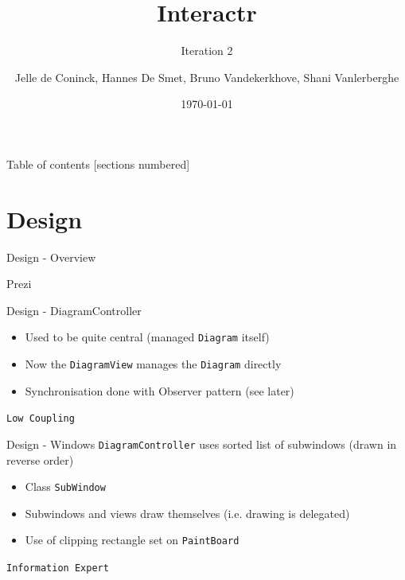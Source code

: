 \documentclass[10pt]{beamer}
\title{Interactr}
\subtitle{Iteration 2}
\date{\today}
\author{Jelle de Coninck, Hannes De Smet, Bruno Vandekerkhove, Shani Vanlerberghe}
\institute{KULeuven}
\begin{document}
\maketitle

\begin{frame}{Table of contents}
  [sections numbered]
  \tableofcontents[hideallsubsections]
\end{frame}

\section{Design}

\begin{frame}[fragile]{Design - Overview}
\begin{center}
Prezi
\end{center}
\end{frame}

\begin{frame}[fragile]{Design - DiagramController}
\begin{itemize}
\item Used to be quite central (managed \texttt{Diagram} itself)
\item Now the \texttt{DiagramView} manages the \texttt{Diagram} directly
\item Synchronisation done with Observer pattern (see later)
\end{itemize}
\begin{center}
\vspace{1cm}
\texttt{Low Coupling}
\end{center}
\end{frame}

\begin{frame}[fragile]{Design - Windows}
\texttt{DiagramController} uses sorted list of subwindows (drawn in reverse order)
\begin{itemize}
\item Class \texttt{SubWindow}
\item Subwindows and views draw themselves (i.e. drawing is delegated)
\item Use of clipping rectangle set on \texttt{PaintBoard}
\end{itemize}
\begin{center}
\vspace{1cm}
\texttt{Information Expert}
\end{center}
\end{frame}
\end{document}
